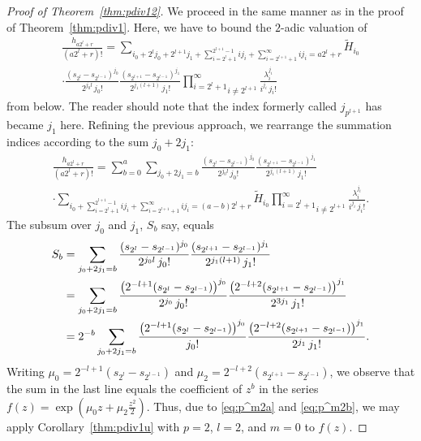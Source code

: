\documentclass[12pt,reqno]{amsart}
\numberwithin{equation}{section}
\theoremstyle{remark}
\begin{document}
\begin{proof}[Proof of Theorem~{\em \ref{thm:pdiv12}}]
We proceed in the same manner as in the proof of
Theorem~\ref{thm:pdiv1}. Here, we have to bound the $2$-adic valuation
of
\begin{multline*} 
\frac {h_{a2^l+r}} {(a2^l+r)!}=
\sum_{i_0+2^lj_0+2^{l+1}j_1
+\sum_{i=2^l+1}^{2^{l+1}-1} ij_i+\sum_{i=2^{l+1}+1}^\infty ij_i=a2^l+r}
\widetilde H_{i_0}\\
\cdot
\frac {(s_{2^l}-s_{2^{l-1}})^{j_0}} {2^{j_0l}\,j_0!}
\frac {(s_{2^{l+1}}-s_{2^{l-1}})^{j_1}} {2^{j_1(l+1)}\,j_1!}
\underset{i\ne 2^{l+1}}{\prod _{i=2^l+1} ^{\infty}}
\frac {{\lambda}_i^{j_i}}
{i^{j_i}\,j_i!}
\end{multline*}
from below. 
The reader should note that the index formerly called $j_{p^{l+1}}$ 
has became $j_1$ here. 
Refining the previous approach, we rearrange the summation
indices according to the sum $j_0+2j_1$:
\begin{multline} \label{eq:H-H32} 
\frac {h_{a2^l+r}} {(a2^l+r)!}=
\sum_{b=0}^a
\sum_{j_0+2j_1=b}
\frac {(s_{2^l}-s_{2^{l-1}})^{j_0}} {2^{j_0l}\,j_0!}
\frac {(s_{2^{l+1}}-s_{2^{l-1}})^{j_1}} {2^{j_1(l+1)}\,j_1!}\\
\cdot
\sum_{i_0+\sum_{i=2^l+1}^{2^{l+1}-1} ij_i
+\sum_{i=2^{l+1}+1}^\infty ij_i=(a-b)2^l+r}
\widetilde H_{i_0}
\underset{i\ne 2^{l+1}}{\prod _{i=2^l+1} ^{\infty}}
\frac {{\lambda}_i^{j_i}}
{i^{j_i}\,j_i!}.
\end{multline}
The subsum over $j_0$ and $j_1$, $S_b$ say, equals
\begin{align} 
\notag
S_b&=\sum_{j_0+2j_1=b}
\frac {(s_{2^l}-s_{2^{l-1}})^{j_0}} {2^{j_0l}\,j_0!}
\frac {(s_{2^{l+1}}-s_{2^{l-1}})^{j_1}} {2^{j_1(l+1)}\,j_1!}\\
\notag
&
=\sum_{j_0+2j_1=b}
\frac {\big(2^{-l+1}(s_{2^l}-s_{2^{l-1}})\big)^{j_0}} {2^{j_0}\,j_0!}
\frac {\big(2^{-l+2}(s_{2^{l+1}}-s_{2^{l-1}})\big)^{j_1}} {2^{3j_1}\,j_1!}\\
&
=
2^{-b}\sum_{j_0+2j_1=b}
\frac {\big(2^{-l+1}(s_{2^l}-s_{2^{l-1}})\big)^{j_0}} {j_0!}
\frac {\big(2^{-l+2}(s_{2^{l+1}}-s_{2^{l-1}})\big)^{j_1}} {2^{j_1}\,j_1!}.
\label{eq:j01}
\end{align}
Writing $\mu_0=2^{-l+1}(s_{2^l}-s_{2^{l-1}})$ and
$\mu_2=2^{-l+2}(s_{2^{l+1}}-s_{2^{l-1}})$, we observe that the sum in
the last line equals the coefficient of $z^{b}$ in the series
$f(z)=\exp\left(\mu_0 z+\mu_2\frac {z^2} {2}\right)$. 
Thus, due to \eqref{eq:p^m2a} and \eqref{eq:p^m2b}, we may apply
Corollary~\ref{thm:pdiv1u} with $p=2$, $l=2$, and $m=0$ to $f(z)$.

\end{proof}
\end{document}
